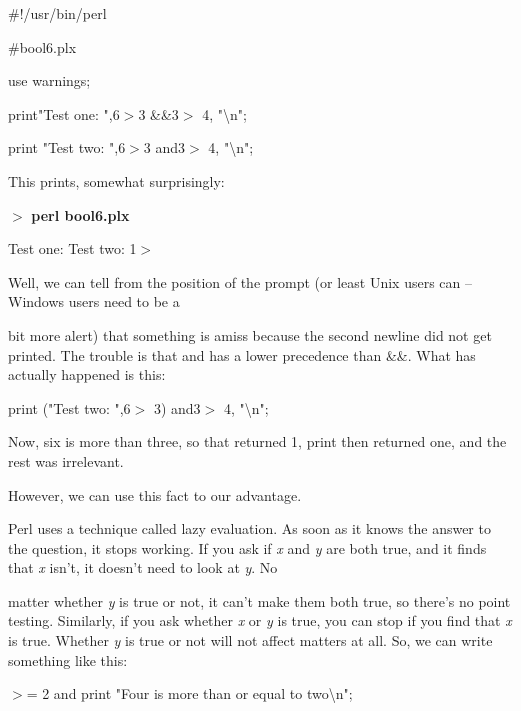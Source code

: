 \documentclass[a4paper,11pt]{book}
\begin{document}
\noindent \#!/usr/bin/perl

\noindent \#bool6.plx

\noindent use warnings;

\noindent print"Test one: ",6$>$3 \&\&3$>$ 4, "\textbackslash n";

\noindent print "Test two: ",6$>$3 and3$>$ 4, "\textbackslash n";

\noindent 

\noindent This prints, somewhat surprisingly:

\noindent 

\noindent $>$ \textbf{perl bool6.plx}

\noindent Test one: Test two: 1$>$

\noindent 

\noindent Well, we can tell from the position of the prompt (or least Unix users can -- Windows users need to be a

\noindent bit more alert) that something is amiss because the second newline did not get printed. The trouble is that and has a lower precedence than \&\&. What has actually happened is this:

\noindent 

\noindent print ("Test two: ",6$>$ 3) and3$>$ 4, "\textbackslash n";

\noindent 

\noindent 

\noindent Now, six is more than three, so that returned 1, print then returned one, and the rest was irrelevant.

\noindent However, we can use this fact to our advantage.

\noindent 

\noindent Perl uses a technique called lazy  evaluation. As soon as it knows the answer to the question, it stops working. If you ask if \textit{x }and \textit{y }are both true, and it finds that \textit{x }isn't, it doesn't need to look at \textit{y}. No

\noindent matter whether \textit{y }is true or not, it can't make them both true, so there's no point testing. Similarly, if you ask whether \textit{x }or \textit{y }is true, you can stop if you find that \textit{x }is true. Whether \textit{y }is true or not will not affect matters at all. So, we can write something like this:

\noindent 

\noindent 

 $>$= 2 and print "Four is more than or equal to two\textbackslash n";
\end{document}
